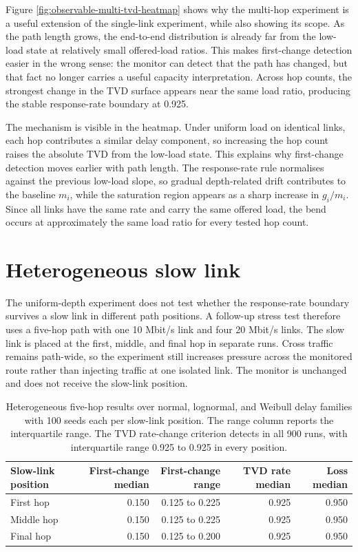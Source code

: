 \documentclass[a4paper,11pt]{report}
\begin{document}
Figure \ref{fig:observable-multi-tvd-heatmap} shows why the multi-hop experiment is a useful extension of the single-link experiment, while also showing its scope. As the path length grows, the end-to-end distribution is already far from the low-load state at relatively small offered-load ratios. This makes first-change detection easier in the wrong sense: the monitor can detect that the path has changed, but that fact no longer carries a useful capacity interpretation. Across hop counts, the strongest change in the TVD surface appears near the same load ratio, producing the stable response-rate boundary at 0.925.

The mechanism is visible in the heatmap. Under uniform load on identical links, each hop contributes a similar delay component, so increasing the hop count raises the absolute TVD from the low-load state. This explains why first-change detection moves earlier with path length. The response-rate rule normalises against the previous low-load slope, so gradual depth-related drift contributes to the baseline \(m_i\), while the saturation region appears as a sharp increase in \(g_i/m_i\). Since all links have the same rate and carry the same offered load, the bend occurs at approximately the same load ratio for every tested hop count.

\section{Heterogeneous slow link}

The uniform-depth experiment does not test whether the response-rate boundary survives a slow link in different path positions. A follow-up stress test therefore uses a five-hop path with one 10 Mbit/s link and four 20 Mbit/s links. The slow link is placed at the first, middle, and final hop in separate runs. Cross traffic remains path-wide, so the experiment still increases pressure across the monitored route rather than injecting traffic at one isolated link. The monitor is unchanged and does not receive the slow-link position.

\begin{table}[htbp]
\centering
\small
\begin{tabular}{lrrrr}
\toprule
Slow-link position & First-change median & First-change range & TVD rate median & Loss median \\
\midrule
First hop & 0.150 & 0.125 to 0.225 & 0.925 & 0.950 \\
Middle hop & 0.150 & 0.125 to 0.225 & 0.925 & 0.950 \\
Final hop & 0.150 & 0.125 to 0.200 & 0.925 & 0.950 \\
\bottomrule
\end{tabular}
\caption{Heterogeneous five-hop results over normal, lognormal, and Weibull delay families with 100 seeds each per slow-link position. The range column reports the interquartile range. The TVD rate-change criterion detects in all 900 runs, with interquartile range 0.925 to 0.925 in every position.}
\label{tab:observable-heterogeneous-methods}
\end{table}
\end{document}
